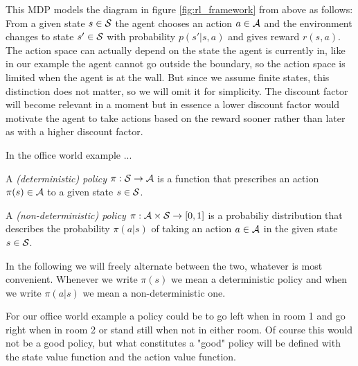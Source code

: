 This MDP models the diagram in figure \ref{fig:rl_framework} from above as follows: From a given state $s \in \S$ the agent chooses an action $a \in \A$ and the environment changes to state $s' \in \S$ with probability $p(s' | s, a)$ and gives reward $r(s, a)$. The action space can actually depend on the state the agent is currently in, like in our example the agent cannot go outside the boundary, so the action space is limited when the agent is at the wall. But since we assume finite states, this distinction does not matter, so we will omit it for simplicity. The discount factor will become relevant in a moment but in essence a lower discount factor would motivate the agent to take actions based on the reward sooner rather than later as with a higher discount factor.

In the office world example ... 


\begin{definition}
    \label{def:policy}
    A \emph{(deterministic) policy} $\pi: \S \to \A$ is a function that prescribes an action $\pi(s) \in \A$ to a given state $s \in \S$.

    A \emph{(non-deterministic) policy} $\pi: \A \times \S \to [0,1]$ is a probabiliy distribution that describes the probability $\pi(a | s)$ of taking an action $a \in \A$ in the given state $s \in \S$.
\end{definition}

In the following we will freely alternate between the two, whatever is most convenient. Whenever we write $\pi(s)$ we mean a deterministic policy and when we write $\pi(a | s)$ we mean a non-deterministic one.

For our office world example a policy could be to go left when in room 1 and go right when in room 2 or stand still when not in either room. Of course this would not be a good policy, but what constitutes a "good" policy will be defined with the state value function and the action value function.


